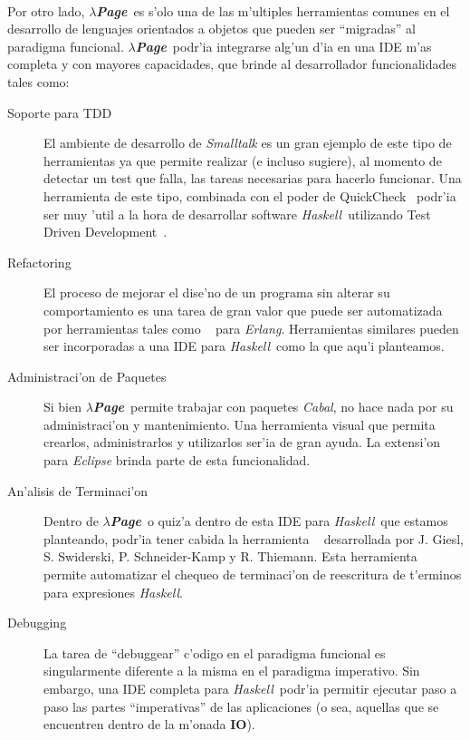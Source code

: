 \documentclass[a4paper]{article}
\newcommand{\haskell}{\textsl{Haskell}}
\newcommand{\hpage}{\textbf{\textsl{$\lambda$Page}}}
\newcommand{\cabal}{\textsl{Cabal}}
\begin{document}
\paragraph{}Por otro lado, \hpage\ es s'olo una de las m'ultiples herramientas comunes en el desarrollo de lenguajes orientados a objetos que pueden ser ``migradas'' al paradigma funcional.  \hpage\ podr'ia integrarse alg'un d'ia en una IDE m'as completa y con mayores capacidades, que brinde al desarrollador funcionalidades tales como:
\begin{description}
	\item[Soporte para TDD] El ambiente de desarrollo de \textsl{Smalltalk} es un gran ejemplo de este tipo de herramientas ya que permite realizar (e incluso sugiere), al momento de detectar un test que falla, las tareas necesarias para hacerlo funcionar.  Una herramienta de este tipo, combinada con el poder de QuickCheck~\cite{quickcheck} podr'ia ser muy 'util a la hora de desarrollar software \haskell\ utilizando Test Driven Development~\cite{tdd}.
	\item[Refactoring~\cite{refactoring}] El proceso de mejorar el dise'no de un programa sin alterar su comportamiento es una tarea de gran valor que puede ser automatizada por herramientas tales como ~\cite{wrangler} para \textsl{Erlang}.  Herramientas similares pueden ser incorporadas a una IDE para \haskell\ como la que aqu'i planteamos.
	\item[Administraci'on de Paquetes] Si bien \hpage\ permite trabajar con paquetes \cabal, no hace nada por su administraci'on y mantenimiento.  Una herramienta visual que permita crearlos, administrarlos y utilizarlos ser'ia de gran ayuda.  La extensi'on ~\cite{eclipsefp} para \textsl{Eclipse} brinda parte de esta funcionalidad.
	\item[An'alisis de Terminaci'on] Dentro de \hpage\ o quiz'a dentro de esta IDE para \haskell\ que estamos planteando, podr'ia tener cabida la herramienta ~\cite{giesl-automated} desarrollada por  J. Giesl, S. Swiderski, P. Schneider-Kamp y R. Thiemann.  Esta herramienta permite automatizar el chequeo de terminaci'on de reescritura de t'erminos para expresiones \textsl{Haskell}.
	\item[Debugging] La tarea de ``debuggear'' c'odigo en el paradigma funcional es singularmente diferente a la misma en el paradigma imperativo.  Sin embargo, una IDE completa para \haskell\ podr'ia permitir ejecutar paso a paso las partes ``imperativas'' de las aplicaciones (o sea, aquellas que se encuentren dentro de la m'onada \textbf{IO}).
\end{description}
\end{document}
